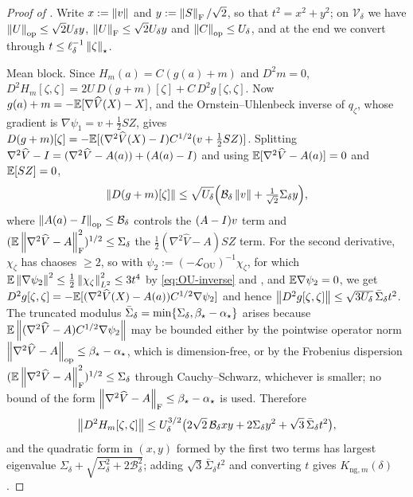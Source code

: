 \begin{proof}[Proof of ]
Write $x:=\left\lVert v\right\rVert$ and $y:=\left\lVert S\right\rVert_{\mathrm{F}}/\sqrt2$, so that $t^2=x^2+y^2$; on
$\mathcal V_\delta$ we have $\left\lVert U\right\rVert_{\mathrm{op}}\leq\sqrt2U_\delta y$,
$\left\lVert U\right\rVert_{\mathrm{F}}\leq\sqrt2U_\delta y$ and $\left\lVert C\right\rVert_{\mathrm{op}}\leq U_\delta$, and at the end we
convert through $t\leq\ell_\delta^{-1}\left\lVert \zeta\right\rVert_\star$.

Mean block. Since $H_m(a)=C(g(a)+m)$ and $D^2m=0$,
$D^2H_m[\zeta,\zeta]=2U\,D(g+m)[\zeta]+C\,D^2g[\zeta,\zeta]$. Now
$g(a)+m=-\mathbb{E}[\nabla\widehat V(X)-X]$, and the Ornstein--Uhlenbeck inverse of $q_\zeta$, whose
gradient is $\nabla\psi_1=v+\tfrac12SZ$, gives
$D(g+m)[\zeta]=-\mathbb{E}[(\nabla^2\widehat V(X)-I)C^{1/2}(v+\tfrac12SZ)]$. Splitting
$\nabla^2\widehat V-I=(\nabla^2\widehat V-A(a))+(A(a)-I)$ and using
$\mathbb{E}[\nabla^2\widehat V-A(a)]=0$ and $\mathbb{E}[SZ]=0$,
\[
    \left\lVert D(g+m)[\zeta]\right\rVert
    \leq\sqrt{U_\delta}\Bigl(\mathcal B_\delta\left\lVert v\right\rVert+\tfrac1{\sqrt2}\Sigma_\delta y\Bigr),
\]
where $\left\lVert A(a)-I\right\rVert_{\mathrm{op}}\leq\mathcal B_\delta$ controls the $(A-I)v$ term and
$(\mathbb{E}\left\lVert \nabla^2\widehat V-A\right\rVert_{\mathrm{F}}^2)^{1/2}\leq\Sigma_\delta$ the
$\tfrac12(\nabla^2\widehat V-A)SZ$ term. For the second derivative, $\chi_\zeta$ has chaoses
$\geq2$, so with $\psi_2:=(-\mathcal L_{\mathrm{OU}})^{-1}\chi_\zeta$, for which
$\mathbb{E}\left\lVert \nabla\psi_2\right\rVert^2\leq\tfrac12\left\lVert \chi_\zeta\right\rVert_{L^2}^2\leq3t^4$ by \eqref{eq:OU-inverse}
and , and $\mathbb{E}\nabla\psi_2=0$, we get
$D^2g[\zeta,\zeta]=-\mathbb{E}[(\nabla^2\widehat V(X)-A(a))C^{1/2}\nabla\psi_2]$ and hence
$\left\lVert D^2g[\zeta,\zeta]\right\rVert\leq\sqrt{3U_\delta}\,\bar\Sigma_\delta t^2$. The truncated modulus
$\bar\Sigma_\delta=\min\{\Sigma_\delta,\beta_\star-\alpha_\star\}$ arises because
$\mathbb{E}\left\lVert (\nabla^2\widehat V-A)C^{1/2}\nabla\psi_2\right\rVert$ may be bounded either by the pointwise
operator norm $\left\lVert \nabla^2\widehat V-A\right\rVert_{\mathrm{op}}\leq\beta_\star-\alpha_\star$, which is
dimension-free, or by the Frobenius dispersion
$(\mathbb{E}\left\lVert \nabla^2\widehat V-A\right\rVert_{\mathrm{F}}^2)^{1/2}\leq\Sigma_\delta$ through Cauchy--Schwarz,
whichever is smaller; no bound of the form
$\left\lVert \nabla^2\widehat V-A\right\rVert_{\mathrm{F}}\leq\beta_\star-\alpha_\star$ is used. Therefore
\[
    \left\lVert D^2H_m[\zeta,\zeta]\right\rVert
    \leq U_\delta^{3/2}\bigl(2\sqrt2\,\mathcal B_\delta xy+2\Sigma_\delta y^2+\sqrt3\,\bar\Sigma_\delta t^2\bigr),
\]
and the quadratic form in $(x,y)$ formed by the first two terms has largest eigenvalue
$\Sigma_\delta+\sqrt{\Sigma_\delta^2+2\mathcal B_\delta^2}$; adding
$\sqrt3\bar\Sigma_\delta t^2$ and converting $t$ gives $K_{\mathrm{ng},m}(\delta)$.


\end{proof}
